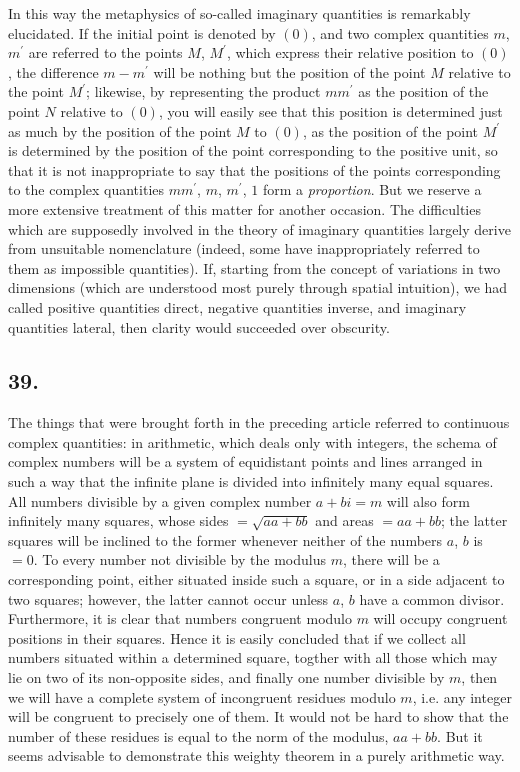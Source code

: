 \documentclass[twoside,12pt]{memoir}
\begin{document}
In this way the metaphysics of so-called imaginary quantities is remarkably elucidated. If the initial point is denoted by \((0)\), and two complex quantities \(m\), \(m^{\prime}\) are referred to the points \(M\), \(M^{\prime}\), which express their relative position to \((0)\), the difference \(m-m^{\prime}\) will be nothing but the position of the point \(M\) relative to the point \(M^{\prime}\); likewise, by representing the product \(m m^{\prime}\) as the position of the point \(N\) relative to \((0)\), you will easily see that this position is determined just as much by the position of the point \(M\) to \((0)\), as the position of the point \(M^{\prime}\) is determined by the position of the point corresponding to the positive unit, so that it is not inappropriate to say that the positions of the points corresponding to the complex quantities \(m m^{\prime}\), \(m\), \(m^{\prime}\), \(1\) form a \textit{proportion}. But we reserve a more extensive treatment of this matter for another occasion. The difficulties which are supposedly involved in the theory of imaginary quantities largely derive from unsuitable nomenclature (indeed, some have inappropriately referred to them as impossible quantities). If, starting from the concept of variations in two dimensions (which are understood most purely through spatial intuition), we had called positive quantities direct, negative quantities inverse, and imaginary quantities lateral, then clarity would succeeded over obscurity.
%

\subsection*{39.}

The things that were brought forth in the preceding article referred to continuous complex quantities: in arithmetic, which deals only with integers, the schema of complex numbers will be a system of equidistant points and lines arranged in such a way that the infinite plane is divided into infinitely many equal squares. All numbers divisible by a given complex number \(a+bi=m\) will also form infinitely many squares, whose sides \(=\sqrt{a a+b b}\) and areas \(=a a+b b\); the latter squares will be inclined to the former whenever neither of the numbers \(a\), \(b\) is \(=0\). To every number not divisible by the modulus \(m\), there will be a corresponding point, either situated inside such a square, or in a side adjacent to two squares; however, the latter cannot occur unless \(a\), \(b\) have a common divisor. Furthermore, it is clear that numbers congruent modulo \(m\) will occupy congruent positions in their squares. Hence it is easily concluded that if we collect all numbers situated within a determined square, togther with all those which may lie on two of its non-opposite sides, and finally one number divisible by \(m\), then we will have a complete system of incongruent residues modulo \(m\), i{.}e{.} any integer will be congruent to precisely one of them. It would not be hard to show that the number of these residues is equal to the norm of the modulus, \(a a+b b\). But it seems advisable to demonstrate this weighty theorem in a purely arithmetic way.
%
\end{document}
